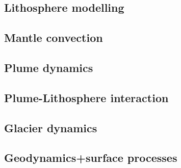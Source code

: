 \subsection*{Lithosphere modelling}

\cite{afrf07}
\cite{affr08}

\subsection*{Mantle convection}

\cite{ande98}
\cite{albe00}
\cite{arfw14}

\subsection*{Plume dynamics}

\subsection*{Plume-Lithosphere interaction}

\subsection*{Glacier dynamics}

\cite{asbl06}

\subsection*{Geodynamics+surface processes}

\cite{avbu96}
\cite{alle08}



